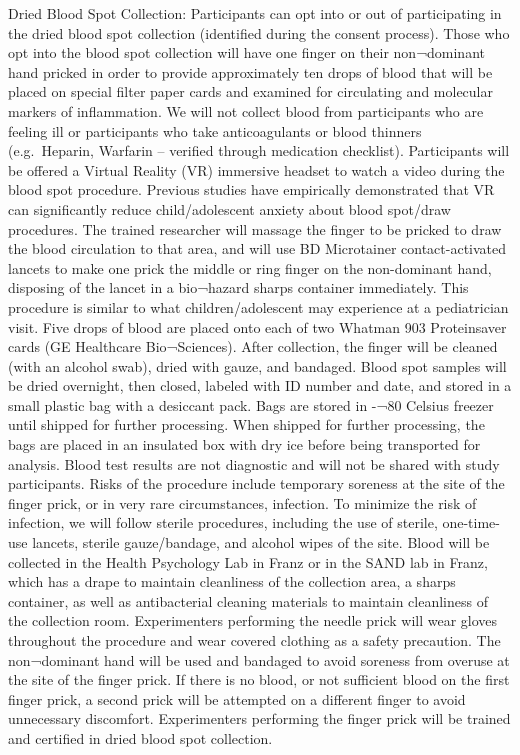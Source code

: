 \documentclass[]{book}
\begin{document}
Dried Blood Spot Collection: Participants can opt into or out of participating in the dried blood spot collection (identified during the consent process). Those who opt into the blood spot collection will have one finger on their non¬dominant hand pricked in order to provide approximately ten drops of blood that will be placed on special filter paper cards and examined for circulating and molecular markers of inflammation. We will not collect blood from participants who are feeling ill or participants who take anticoagulants or blood thinners (e.g.~Heparin, Warfarin -- verified through medication checklist). Participants will be offered a Virtual Reality (VR) immersive headset to watch a video during the blood spot procedure. Previous studies have empirically demonstrated that VR can significantly reduce child/adolescent anxiety about blood spot/draw procedures. The trained researcher will massage the finger to be pricked to draw the blood circulation to that area, and will use BD Microtainer contact-activated lancets to make one prick the middle or ring finger on the non-dominant hand, disposing of the lancet in a bio¬hazard sharps container immediately. This procedure is similar to what children/adolescent may experience at a pediatrician visit. Five drops of blood are placed onto each of two Whatman 903 Proteinsaver cards (GE Healthcare Bio¬Sciences). After collection, the finger will be cleaned (with an alcohol swab), dried with gauze, and bandaged. Blood spot samples will be dried overnight, then closed, labeled with ID number and date, and stored in a small plastic bag with a desiccant pack. Bags are stored in -¬80 Celsius freezer until shipped for further processing. When shipped for further processing, the bags are placed in an insulated box with dry ice before being transported for analysis. Blood test results are not diagnostic and will not be shared with study participants. Risks of the procedure include temporary soreness at the site of the finger prick, or in very rare circumstances, infection. To minimize the risk of infection, we will follow sterile procedures, including the use of sterile, one-time-use lancets, sterile gauze/bandage, and alcohol wipes of the site. Blood will be collected in the Health Psychology Lab in Franz or in the SAND lab in Franz, which has a drape to maintain cleanliness of the collection area, a sharps container, as well as antibacterial cleaning materials to maintain cleanliness of the collection room. Experimenters performing the needle prick will wear gloves throughout the procedure and wear covered clothing as a safety precaution. The non¬dominant hand will be used and bandaged to avoid soreness from overuse at the site of the finger prick. If there is no blood, or not sufficient blood on the first finger prick, a second prick will be attempted on a different finger to avoid unnecessary discomfort. Experimenters performing the finger prick will be trained and certified in dried blood spot collection.
\end{document}
